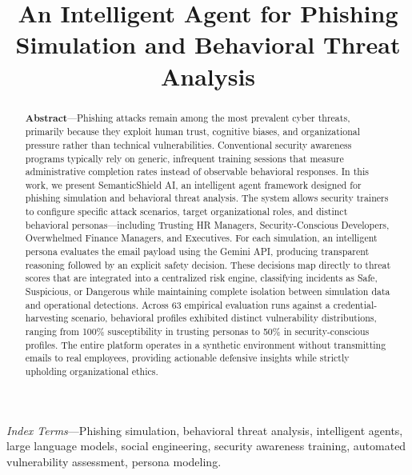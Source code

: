 \documentclass[conference,letterpaper]{IEEEtran}
\begin{document}
\title{\textbf{An Intelligent Agent for Phishing Simulation and Behavioral Threat Analysis}}

\author{
}

\maketitle

\begin{abstract}
\textbf{Abstract}---Phishing attacks remain among the most prevalent cyber threats, primarily because they exploit human trust, cognitive biases, and organizational pressure rather than technical vulnerabilities. Conventional security awareness programs typically rely on generic, infrequent training sessions that measure administrative completion rates instead of observable behavioral responses. In this work, we present SemanticShield AI, an intelligent agent framework designed for phishing simulation and behavioral threat analysis. The system allows security trainers to configure specific attack scenarios, target organizational roles, and distinct behavioral personas---including Trusting HR Managers, Security-Conscious Developers, Overwhelmed Finance Managers, and Executives. For each simulation, an intelligent persona evaluates the email payload using the Gemini API, producing transparent reasoning followed by an explicit safety decision. These decisions map directly to threat scores that are integrated into a centralized risk engine, classifying incidents as Safe, Suspicious, or Dangerous while maintaining complete isolation between simulation data and operational detections. Across 63 empirical evaluation runs against a credential-harvesting scenario, behavioral profiles exhibited distinct vulnerability distributions, ranging from 100\% susceptibility in trusting personas to 50\% in security-conscious profiles. The entire platform operates in a synthetic environment without transmitting emails to real employees, providing actionable defensive insights while strictly upholding organizational ethics.
\end{abstract}

\begin{IEEEkeywords}
\textit{Index Terms}---Phishing simulation, behavioral threat analysis, intelligent agents, large language models, social engineering, security awareness training, automated vulnerability assessment, persona modeling.
\end{IEEEkeywords}
\end{document}
